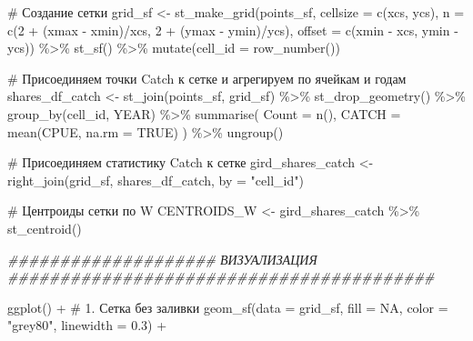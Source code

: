 \documentclass[
  letterpaper,
  DIV=11,
  numbers=noendperiod]{scrreprt}
\newenvironment{Shaded}{\begin{snugshade}}{\end{snugshade}}
\newcommand{\AttributeTok}[1]{\textcolor[rgb]{0.40,0.45,0.13}{#1}}
\newcommand{\CommentTok}[1]{\textcolor[rgb]{0.37,0.37,0.37}{#1}}
\newcommand{\ConstantTok}[1]{\textcolor[rgb]{0.56,0.35,0.01}{#1}}
\newcommand{\DecValTok}[1]{\textcolor[rgb]{0.68,0.00,0.00}{#1}}
\newcommand{\DocumentationTok}[1]{\textcolor[rgb]{0.37,0.37,0.37}{\textit{#1}}}
\newcommand{\FloatTok}[1]{\textcolor[rgb]{0.68,0.00,0.00}{#1}}
\newcommand{\FunctionTok}[1]{\textcolor[rgb]{0.28,0.35,0.67}{#1}}
\newcommand{\NormalTok}[1]{\textcolor[rgb]{0.00,0.23,0.31}{#1}}
\newcommand{\OtherTok}[1]{\textcolor[rgb]{0.00,0.23,0.31}{#1}}
\newcommand{\SpecialCharTok}[1]{\textcolor[rgb]{0.37,0.37,0.37}{#1}}
\newcommand{\StringTok}[1]{\textcolor[rgb]{0.13,0.47,0.30}{#1}}
\begin{document}
\begin{Shaded}
\begin{Highlighting}[]
\CommentTok{\# Создание сетки}
\NormalTok{grid\_sf }\OtherTok{\textless{}{-}} \FunctionTok{st\_make\_grid}\NormalTok{(points\_sf, }
                        \AttributeTok{cellsize =} \FunctionTok{c}\NormalTok{(xcs, ycs),}
                        \AttributeTok{n =} \FunctionTok{c}\NormalTok{(}\DecValTok{2} \SpecialCharTok{+}\NormalTok{ (xmax }\SpecialCharTok{{-}}\NormalTok{ xmin)}\SpecialCharTok{/}\NormalTok{xcs, }\DecValTok{2} \SpecialCharTok{+}\NormalTok{ (ymax }\SpecialCharTok{{-}}\NormalTok{ ymin)}\SpecialCharTok{/}\NormalTok{ycs),}
                        \AttributeTok{offset =} \FunctionTok{c}\NormalTok{(xmin }\SpecialCharTok{{-}}\NormalTok{ xcs, ymin }\SpecialCharTok{{-}}\NormalTok{ ycs)) }\SpecialCharTok{\%\textgreater{}\%} 
  \FunctionTok{st\_sf}\NormalTok{() }\SpecialCharTok{\%\textgreater{}\%} 
  \FunctionTok{mutate}\NormalTok{(}\AttributeTok{cell\_id =} \FunctionTok{row\_number}\NormalTok{())}

\CommentTok{\# Присоединяем точки Catch к сетке и агрегируем по ячейкам и годам}
\NormalTok{shares\_df\_catch }\OtherTok{\textless{}{-}} \FunctionTok{st\_join}\NormalTok{(points\_sf, grid\_sf) }\SpecialCharTok{\%\textgreater{}\%} 
  \FunctionTok{st\_drop\_geometry}\NormalTok{() }\SpecialCharTok{\%\textgreater{}\%} 
  \FunctionTok{group\_by}\NormalTok{(cell\_id, YEAR) }\SpecialCharTok{\%\textgreater{}\%} 
  \FunctionTok{summarise}\NormalTok{(}
    \AttributeTok{Count =} \FunctionTok{n}\NormalTok{(),}
    \AttributeTok{CATCH =} \FunctionTok{mean}\NormalTok{(CPUE, }\AttributeTok{na.rm =} \ConstantTok{TRUE}\NormalTok{)}
\NormalTok{  ) }\SpecialCharTok{\%\textgreater{}\%} 
  \FunctionTok{ungroup}\NormalTok{()}

\CommentTok{\# Присоединяем статистику Catch к сетке}
\NormalTok{gird\_shares\_catch }\OtherTok{\textless{}{-}} \FunctionTok{right\_join}\NormalTok{(grid\_sf, shares\_df\_catch, }\AttributeTok{by =} \StringTok{"cell\_id"}\NormalTok{)}



\CommentTok{\# Центроиды сетки по W}
\NormalTok{CENTROIDS\_W }\OtherTok{\textless{}{-}}\NormalTok{ gird\_shares\_catch }\SpecialCharTok{\%\textgreater{}\%} 
  \FunctionTok{st\_centroid}\NormalTok{()}

\DocumentationTok{\#\#\#\#\#\#\#\#\#\#\#\#\#\#\#\#\#\#\#\# ВИЗУАЛИЗАЦИЯ \#\#\#\#\#\#\#\#\#\#\#\#\#\#\#\#\#\#\#\#\#\#\#\#\#\#\#\#\#\#\#\#\#\#\#\#\#\#\#\#\#}

\FunctionTok{ggplot}\NormalTok{() }\SpecialCharTok{+}
  \CommentTok{\# 1. Сетка без заливки}
  \FunctionTok{geom\_sf}\NormalTok{(}\AttributeTok{data =}\NormalTok{ grid\_sf, }\AttributeTok{fill =} \ConstantTok{NA}\NormalTok{, }\AttributeTok{color =} \StringTok{"grey80"}\NormalTok{, }\AttributeTok{linewidth =} \FloatTok{0.3}\NormalTok{) }\SpecialCharTok{+}
  

\end{Highlighting}
\end{Shaded}
\end{document}
